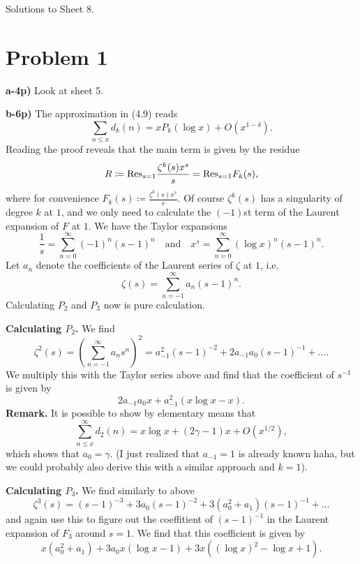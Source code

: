 \documentclass[a4paper,11pt]{article}
\author{Max von Consbruch}
\begin{document}
\begin{center}
    \huge{Solutions to Sheet 8.}
\end{center}

\section*{Problem 1}
\textbf{a-4p)} Look at sheet 5.

\textbf{b-6p)} The approximation in (4.9) reads 
\[
    \sum_{n \leq x} d_k(n) = x P_k(\log x) + O(x^{1-\delta}).
\]
Reading the proof reveals that the main term is given by the residue
\[
    R \coloneqq \mathrm{Res}_{s=1} \frac{\zeta^k(s) x^s}s = \mathrm{Res}_{s=1} F_k(s),
\]
where for convenience $F_k(s) \coloneqq \frac{\zeta^k(s) x^s}s.$
Of course $\zeta^k(s)$ has a singularity of degree $k$ at $1$, and we only need 
to calculate the $(-1)$st term of the Laurent expansion of $F$ at $1$. 
We have the Taylor expansions
\[
    \frac 1{s} =  \sum_{n=0}^\infty (-1)^n (s-1)^n 
    \quad \text{and} \quad
    x^s = \sum_{n=0}^\infty (\log x)^n (s-1)^n.
\]
Let $a_n$ denote the coefficients of the Laurent series of $\zeta$ at $1$, i.e.
\[
    \zeta(s) = \sum_{n = -1}^\infty a_n (s-1)^n.
\]
Calculating $P_2$ and $P_3$ now is pure calculation. 

\textbf{Calculating $P_2$.} We find
\[
    \zeta^2(s) = \left( \sum_{n=-1}^\infty a_n s^n \right)^2
    = a_{-1}^2 (s-1)^{-2} + 2a_{-1}a_0 (s-1)^{-1} + \dots.
\]
We multiply this with the Taylor series above and find that the coefficient of 
$s^{-1}$ is given by 
\[
    2a_{-1}a_0 x + a_{-1}^2 (x \log x - x).
\]
\textbf{Remark.} It is possible to show by elementary means that 
\[
    \sum_{n\leq x}^\infty d_2(n) = x \log x + (2\gamma-1)x + O(x^{1/2}),
\]
which shows that $a_0 = \gamma$. (I just realized that $a_{-1} = 1$ is already
known haha, but we could probably also derive this with a similar approach and
$k=1$).

\textbf{Calculating $P_3$.} We find similarly to above
\[
    \zeta^3(s) = (s-1)^{-3} + 3a_0 (s-1)^{-2} + 3(a_0^2 + a_1)(s-1)^{-1} + \dots
\]
and again use this to figure out the coeffitient of $(s-1)^{-1}$ in the 
Laurent expansion of $F_3$ around $s=1$. We find that this coefficient is given by
\[
    x(a_0^2 + a_1) + 3a_0x ( \log x - 1) + 3x ((\log x)^2 - \log x + 1).
\]
\end{document}
